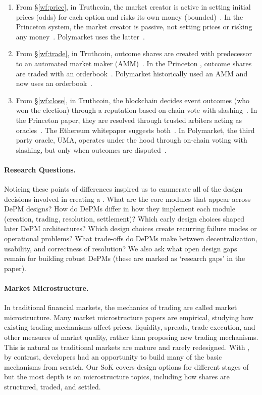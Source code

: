 \begin{enumerate}
\item From \S\ref{wf:price}, in Truthcoin, the market creator is active in setting initial prices (\ie odds) for each option and risks its own money (bounded)~\cite{Sz14}. In the Princeton system, the market creator is passive, not setting prices or risking any money~\cite{BCFKMN14}. Polymarket uses the latter~\cite{poly}. 

\item From \S\ref{wf:trade}, in Truthcoin, outcome shares are created with predecessor to an automated market maker (AMM)~\cite{Sz14}. In the Princeton \depm, outcome shares are traded with an orderbook~\cite{BCFKMN14}. Polymarket historically used an AMM and now uses an orderbook~\cite{poly}. 

\item From \S\ref{wf:close}, in Truthcoin, the blockchain decides event outcomes (\eg who won the election) through a reputation-based on-chain vote with slashing~\cite{Sz14}. In the Princeton paper, they are resolved through trusted arbiters acting as oracles~\cite{BCFKMN14}. The Ethereum whitepaper suggests both~\cite{But13}. In Polymarket, the third party oracle, UMA, operates under the hood through on-chain voting with slashing, but only when outcomes are disputed~\cite{poly,uma}.
\end{enumerate}

\paragraph{Research Questions.} Noticing these points of differences inspired us to enumerate all of the design decisions involved in creating a \depm. What are the core modules that appear across DePM designs? How do DePMs differ in how they implement each module (creation, trading, resolution, settlement)? Which early design choices shaped later DePM architectures? Which design choices create recurring failure modes or operational problems? What trade-offs do DePMs make between decentralization, usability, and correctness of resolution? We also ask what open design gaps remain for building robust DePMs (these are marked as `research gaps' in the paper).

\paragraph{Market Microstructure.} In traditional financial markets, the mechanics of trading are called market microstructure. Many market microstructure papers are empirical, studying how existing trading mechanisms affect prices, liquidity, spreads, trade execution, and other measures of market quality, rather than proposing new trading mechanisms. This is natural as traditional markets are mature and rarely redesigned. With \depms, by contrast, developers had an opportunity to build many of the basic mechanisms from scratch. Our SoK covers design options for different stages of \depms but the most depth is on microstructure topics, including how shares are structured, traded, and settled.


